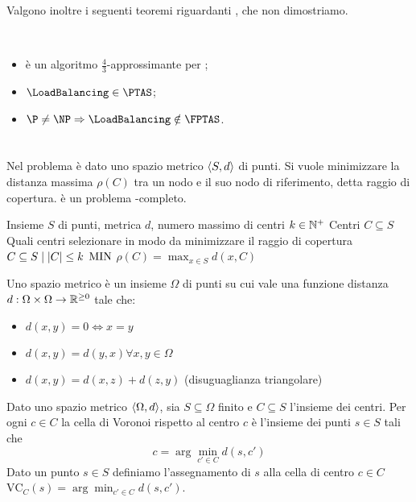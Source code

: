 Valgono inoltre i seguenti teoremi riguardanti \LoadBalancing, che non dimostriamo.
\begin{theorem}~
	\begin{itemize}
		\item \SortedGreedyBalance è un algoritmo $\frac43$-approssimante per \LoadBalancing \cite{Graham:69:sortedgreedybalance};
		\item $\LoadBalancing\in\PTAS$;
		\item $\P\neq\NP\impl\LoadBalancing\notin\FPTAS$.
	\end{itemize}
\end{theorem}



\section{\CenterSelection}
Nel problema \CenterSelection è dato uno spazio metrico $\langle S,d \rangle$ di punti.
Si vuole minimizzare la distanza massima $\rho(C)$ tra un nodo e il suo nodo di riferimento, detta raggio di copertura.
\CenterSelection è un problema \NPO-completo.

\popt{\CenterSelection}
{Insieme $S$ di punti, metrica $d$, numero massimo di centri $k\in\mathbb N^+$}
{Centri $C\subseteq S$}
{Quali centri selezionare in modo da minimizzare il raggio di copertura}
{$C\subseteq S\mid | C |\leq k$}
{$\mathrm{MIN}$}
{$\rho(C) = \max_{x \in S} d(x, C)$}

Uno spazio metrico è un insieme $\Omega$ di punti su cui vale una funzione distanza $d:\Omega\times\Omega\to\mathbb R^{\geq0}$ tale che:
\begin{itemize}
	\item $d(x,y)=0\iff x=y$
	\item $d(x,y)=d(y,x)\forall x,y\in\Omega$
	\item $d(x,y)=d(x,z)+d(z,y)$ (disuguaglianza triangolare)
\end{itemize}

\begin{defin}
	Dato uno spazio metrico $\langle \Omega,d \rangle$, sia $S\subseteq\Omega$ finito e $C\subseteq S$ l'insieme dei centri. Per ogni $c\in C$ la cella di Voronoi rispetto al centro $c$ è l'insieme dei punti $s\in S$ tali che
	\begin{equation*}
		c=\arg\min_{c'\in C} d(s,c')
	\end{equation*}
	Dato un punto $s\in S$ definiamo l'assegnamento di $s$ alla cella di centro $c\in C$ $\text{VC}_C(s)=\arg\min_{c'\in C} d(s,c')$.
\end{defin}

